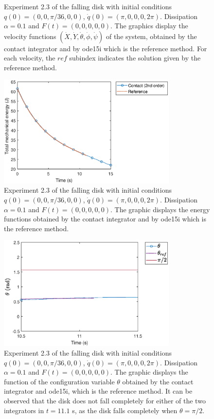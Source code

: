 \documentclass{aims}
\numberwithin{equation}{section}
\theoremstyle{definition}
\begin{document}
\begin{figure}
\begin{subfigure}[b]{0.75\textwidth}
  \end{subfigure}
  \caption{Experiment 2.3 of the falling disk with initial conditions ${q(0) = (0,0,\pi/36,0,0)}$, ${\dot{q}(0) = (\pi,0,0,0,2\pi)}$. Dissipation ${\alpha = 0.1}$ and ${F(t) = (0,0,0,0,0)}$. The graphics display the velocity functions $(\dot{X},\dot{Y},\dot{\theta},\dot{\phi},\dot{\psi})$ of the system, obtained by the contact integrator and by ode15i which is the reference method. For each velocity, the $ref$ subindex indicates the solution given by the reference method.}
  \label{fig:disco_experimento_2_3_2}
\end{figure}

\begin{figure}
  \centering
  \includegraphics[width=0.8\textwidth]{fig/23energia.eps}
  \caption{Experiment 2.3 of the falling disk with initial conditions ${q(0) = (0,0,\pi/36,0,0)}$, ${\dot{q}(0) = (\pi,0,0,0,2\pi)}$. Dissipation ${\alpha = 0.1}$ and ${F(t) = (0,0,0,0,0)}$. The graphic displays the energy functions obtained by the contact integrator and by ode15i which is the reference method.}
  \label{fig:disco_experimento_2_3_3}
\end{figure}

\begin{figure}
  \centering
  \includegraphics[width=0.8\textwidth]{fig/23theta.eps}
  \caption{Experiment 2.3 of the falling disk with initial conditions ${q(0) = (0,0,\pi/36,0,0)}$, ${\dot{q}(0) = (\pi,0,0,0,2\pi)}$. Dissipation ${\alpha = 0.1}$ and ${F(t) = (0,0,0,0,0)}$. The graphic displays the function of the configuration variable $\theta$ obtained by the contact integrator and ode15i, which is the reference method. It can be observed that the disk does not fall completely for either of the two integrators in $t = 11.1$ s, as the disk falls completely when $\theta = \pi/2$.}
  \label{fig:disco_experimento_2_3_4}
\end{figure}
\end{document}
